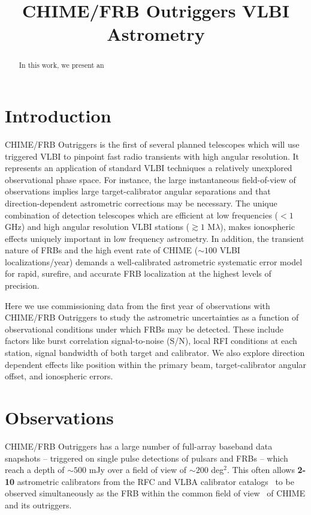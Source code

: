 \documentclass[twocolumn]{aastex631}
\begin{document}
\title{CHIME/FRB Outriggers VLBI Astrometry}
%


\begin{abstract}
In this work, we present an  
\end{abstract}

\section{Introduction}
CHIME/FRB Outriggers is the first of several planned telescopes which will use triggered VLBI to pinpoint fast radio transients with high angular resolution. It represents an application of standard VLBI techniques  a relatively unexplored observational phase space. For instance, the large instantaneous field-of-view of observations implies large target-calibrator angular separations and that direction-dependent astrometric corrections may be necessary. The unique combination of detection telescopes which are efficient at low frequencies ($< 1$ GHz) and high angular resolution VLBI stations ($\gtrsim 1$ M$\lambda$), makes ionospheric effects uniquely important in low frequency astrometry. In addition, the transient nature of FRBs and the high event rate of CHIME ($\sim 100$ VLBI localizations/year) demands a well-calibrated astrometric systematic error model for rapid, surefire, and accurate FRB localization at the highest levels of precision.

Here we use commissioning data from the first year of observations with CHIME/FRB Outriggers to study the astrometric uncertainties as a function of observational conditions under which FRBs may be detected. These include factors like burst correlation signal-to-noise (S/N), local RFI conditions at each station, signal bandwidth of both target and calibrator. We also explore direction dependent effects like position within the primary beam, target-calibrator angular offset, and ionospheric errors.

\section{Observations}
CHIME/FRB Outriggers has a large number of full-array baseband data snapshots -- triggered on single pulse detections of pulsars and FRBs -- which reach a depth of $\sim 500$ mJy over a field of view of $\sim 200$ deg$^2$. This often allows \textbf{2-10} astrometric calibrators from the RFC and VLBA calibrator catalogs~\citep{ma1998international,petrov2021wide} to be observed simultaneously as the FRB within the common field of view~\citep{andrew2024vlbi} of CHIME and its outriggers.
\end{document}
